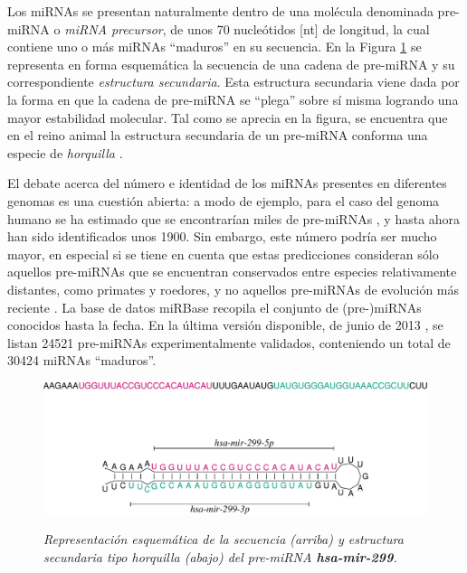 \documentclass[12pt,bibliography=oldstyle,DIV=12,parskip=full-,titlepage]{scrartcl}
\begin{document}
Los miRNAs se presentan naturalmente dentro de una molécula denominada
pre-miRNA o \emph{miRNA precursor}, de unos 70 nucleótidos [nt] de
longitud, la cual contiene uno o más miRNAs ``maduros'' en su
secuencia. En la Figura \ref{horquilla} se representa en forma
esquemática la secuencia de una cadena de pre-miRNA y su
correspondiente \emph{estructura secundaria}. Esta estructura
secundaria viene dada por la forma en que la cadena de pre-miRNA se
``plega'' sobre sí misma logrando una mayor estabilidad molecular. Tal
como se aprecia en la figura, se encuentra que en el reino animal la
estructura secundaria de un pre-miRNA conforma una especie de
\emph{horquilla} \cite{bartel116}\cite{sewer}.

\newpage
El debate acerca del número e identidad de los miRNAs presentes en
diferentes genomas es una cuestión abierta: a modo de ejemplo, para el
caso del genoma humano se ha estimado que se encontrarían miles de
pre-miRNAs \cite{batuwita}, y hasta ahora han sido identificados unos
1900. Sin embargo, este número podría ser mucho mayor, en especial si
se tiene en cuenta que estas predicciones consideran sólo aquellos
pre-miRNAs que se encuentran conservados entre especies
relativamente distantes, como primates y roedores, y no aquellos
pre-miRNAs de evolución más reciente \cite{sewer}.  La base de datos
miRBase%
\cite{mirbase2}\cite{mirbase3} recopila el conjunto de
\mbox{(pre-)miRNAs} conocidos hasta la fecha. En la última versión
disponible, de junio de
2013%
, se listan
24521 pre-miRNAs experimentalmente validados, conteniendo un total de
30424 miRNAs ``maduros''.
%
\begin{figure}
  \small\slshape\center
  \includegraphics[width=.9\textwidth]{res/hsa-mir-299_ss.pdf}
  \caption{\small\slshape Representación esquemática de la secuencia (arriba) y
    estructura secundaria tipo horquilla (abajo) del pre-miRNA
    \textbf{hsa-mir-299}.
  }
  \label{horquilla}
\end{figure}
\end{document}

